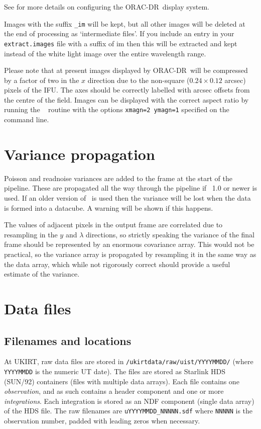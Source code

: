 \documentclass[twoside,11pt,nolof]{starlink}
\providecommand{\KAPPA}{\xref{{\sc{Kappa}}}{sun95}{}}
\providecommand{\ORACDR}{{\footnotesize ORAC-DR}}
\begin{document}
See  for more details on configuring the
\ORACDR\ display system.

Images with the suffix \texttt{\_im} will be kept, but all other images
will be deleted at the end of processing as `intermediate files'. If
you include an entry in your \texttt{extract.images} file with a suffix
of {im} then this will be extracted and kept instead of the white
light image over the entire wavelength range.

Please note that at present images displayed by \ORACDR\ will be
compressed by a factor of two in the $x$ direction due to the
non-square ($0.24 \times 0.12$ arcsec) pixels of the IFU. The axes
should be correctly labelled with arcsec offsets from the centre of
the field. Images can be displayed with the correct aspect ratio by
running the \KAPPA\  routine with
the options \texttt{xmagn=2 ymagn=1} specified on the command line.


\section{Variance propagation}

Poisson and readnoise variances are added to the frame at the start of
the pipeline. These are propagated all the way through the pipeline if
\KAPPA\ 1.0 or newer is used. If an older version of \KAPPA\ is used
then the variance will be lost when the data is formed into a
datacube. A warning will be shown if this happens.

The values of adjacent pixels in the output frame are correlated due
to resampling in the $y$ and $\lambda$ directions, so strictly
speaking the variance of the final frame should be represented by an
enormous covariance array. This would not be practical, so the
variance array is propagated by resampling it in the same way as the
data array, which while not rigorously correct should provide a
useful estimate of the variance.


\section{Data files}

\subsection{Filenames and locations}

At UKIRT, raw data files are stored in \texttt{/ukirtdata/raw/uist/YYYYMMDD/} (where \texttt{YYYYMMDD} is the numeric
UT date).  The files are stored as Starlink HDS (SUN/92) containers (files
with multiple data arrays). Each file contains one \emph{observation},
and as such contains a header component and one or more
\emph{integrations}.  Each integration is stored as an NDF component
(single data array) of the HDS file. The raw filenames are \texttt{uYYYYMMDD\_NNNNN.sdf} where \texttt{NNNNN} is the observation number,
padded with leading zeros when necessary.
\end{document}
